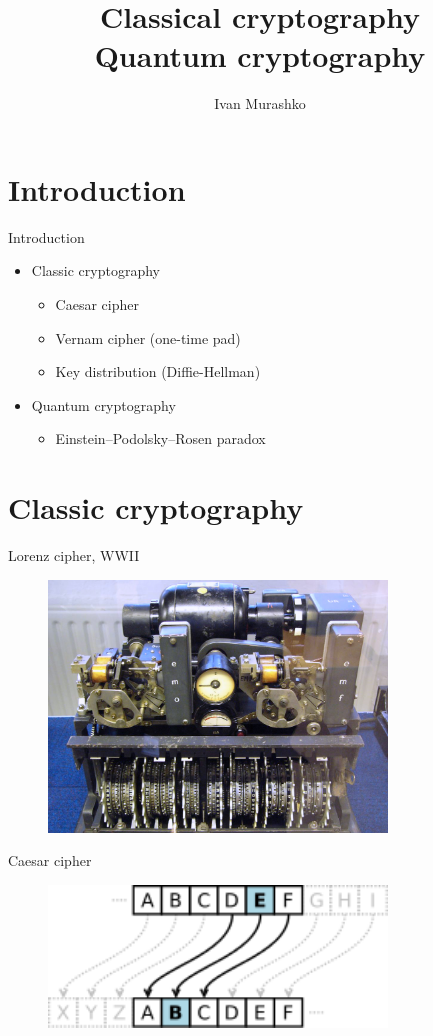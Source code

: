 \documentclass[10pt,pdf,hyperref={unicode}]{beamer}
\title[Quantum cryptography]{Classical
  cryptography\\Quantum cryptography}
\author{Ivan Murashko}
\date{}
\begin{document}
\begin{frame}
\titlepage
\end{frame}


\section{Introduction}

\begin{frame}{Introduction}
\begin{itemize}
\item Classic cryptography
  \begin{itemize}
    \item Caesar cipher
    \item Vernam cipher (one-time pad)
    \item Key distribution (Diffie-Hellman)
  \end{itemize}
\item Quantum cryptography
  \begin{itemize}
    \item Einstein–Podolsky–Rosen paradox
  \end{itemize}
\end{itemize}
\end{frame}

\section{Classic cryptography}

\begin{frame}{Lorenz cipher, WWII}
 \begin{figure} 
   \includegraphics[width=90mm,scale=0.5]{class_crypto.jpg}
  \end{figure}
\end{frame}


\begin{frame}{Caesar cipher}
 \begin{figure} 
   \includegraphics[width=90mm,scale=0.5]{caesar_cipher.png}
  \end{figure}
\end{frame}
\end{document}
